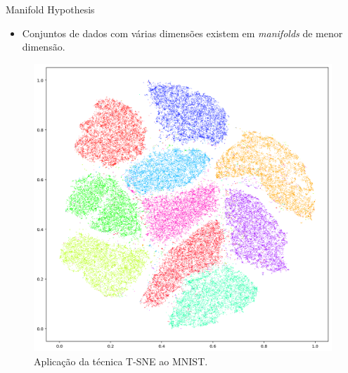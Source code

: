 \documentclass[dvipsnames]{beamer}
\begin{document}
\begin{frame}{Manifold Hypothesis}

	\begin{itemize}
		\item Conjuntos de dados com várias dimensões existem em \emph{manifolds} de menor dimensão.
	\end{itemize}

	\begin{figure}
		\centering
		\includegraphics[scale=0.2]{img/tsne-mnist.png}
        \caption{Aplicação da técnica T-SNE ao MNIST.}
	\end{figure}

\end{frame}
\end{document}
